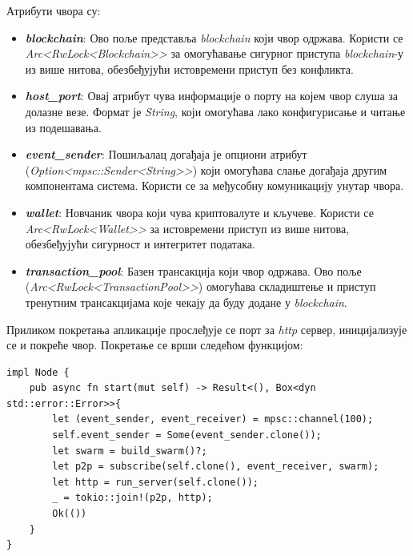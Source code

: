 \documentclass[12pt, a4paper]{article}
\begin{document}
Атрибути чвора су:
\begin{itemize}
    \item \textbf{\textit{blockchain}}: Ово поље представља \textit{blockchain} који чвор одржава. Користи се \textit{Arc<RwLock<Blockchain>>} за омогућавање сигурног приступа \textit{blockchain}-у из више нитова, обезбеђујући истовремени приступ без конфликта.
    \item \textbf{\textit{host\_port}}: Овај атрибут чува информације о порту на којем чвор слуша за долазне везе. Формат је \textit{String}, који омогућава лако конфигурисање и читање из подешавања.
    \item \textbf{\textit{event\_sender}}: Пошиљалац догађаја је опциони атрибут \linebreak(\textit{Option<mpsc::Sender<String>>}) који омогућава слање догађаја другим компонентама система. Користи се за међусобну комуникацију унутар чвора.
    \item \textbf{\textit{wallet}}: Новчаник чвора који чува криптовалуте и кључеве. Користи се \linebreak\textit{Arc<RwLock<Wallet>>} за истовремени приступ из више нитова, обезбеђујући сигурност и интегритет података.
    \item \textbf{\textit{transaction\_pool}}: Базен трансакција који чвор одржава. Ово поље \linebreak(\textit{Arc<RwLock<TransactionPool>>}) омогућава складиштење и приступ тренутним трансакцијама које чекају да буду додане у \textit{blockchain}.
\end{itemize}
\newpage
Приликом покретања апликације прослеђује се порт за \textit{http} сервер, иницијализује се и покреће чвор. Покретање се врши следећом функцијом:

\begin{verbatim}
impl Node {
    pub async fn start(mut self) -> Result<(), Box<dyn std::error::Error>>{
        let (event_sender, event_receiver) = mpsc::channel(100);
        self.event_sender = Some(event_sender.clone());
        let swarm = build_swarm()?;
        let p2p = subscribe(self.clone(), event_receiver, swarm);
        let http = run_server(self.clone());
        _ = tokio::join!(p2p, http);
        Ok(())
    }
}
\end{verbatim}
\end{document}

